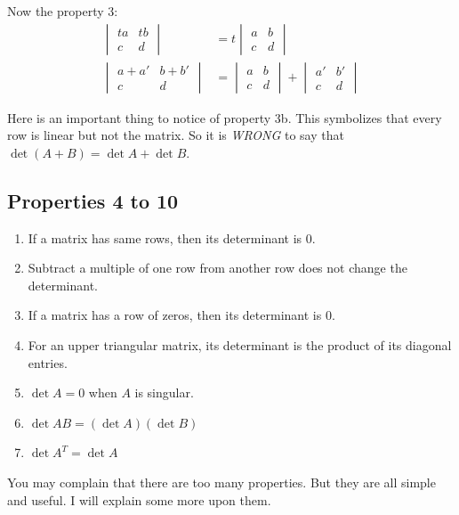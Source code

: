 \documentclass[10pt,a4paper,oneside,numbers=noenddot]{scrbook}
\theoremstyle{ctplain}
\theoremstyle{ctresult}
\begin{document}
Now the property 3:
\begin{align*}
  \begin{vmatrix}
    ta & tb \\
    c & d
  \end{vmatrix} &=
  t \begin{vmatrix}
    a & b \\
    c & d
  \end{vmatrix} \tag{3a}\\
  \begin{vmatrix}
    a + a' & b + b' \\
    c & d
  \end{vmatrix} &=
  \begin{vmatrix}
    a & b \\
    c & d
  \end{vmatrix}
  +
  \begin{vmatrix}
    a' & b' \\
    c & d
  \end{vmatrix} \tag{3b}
\end{align*}

Here is an important thing to notice of property 3b. This symbolizes that every row
is linear but not the matrix. So it is \emph{WRONG} to say that $\det(A + B) =
\det A + \det B$.

\subsection{Properties 4 to 10}

\begin{enumerate}[start=4,label=(\arabic*)]
  \item If a matrix has same rows, then its determinant is 0.
  \item Subtract a multiple of one row from another row does not change the determinant.
  \item If a matrix has a row of zeros, then its determinant is 0.
  \item For an upper triangular matrix, its determinant is the product of its diagonal
entries.
  \item $\det A = 0$ when $A$ is singular.
  \item $\det AB = (\det A)(\det B)$
  \item $\det A^{T} = \det A$
\end{enumerate}

You may complain that there are too many properties. But they are all simple and useful.
I will explain some more upon them.
\end{document}
